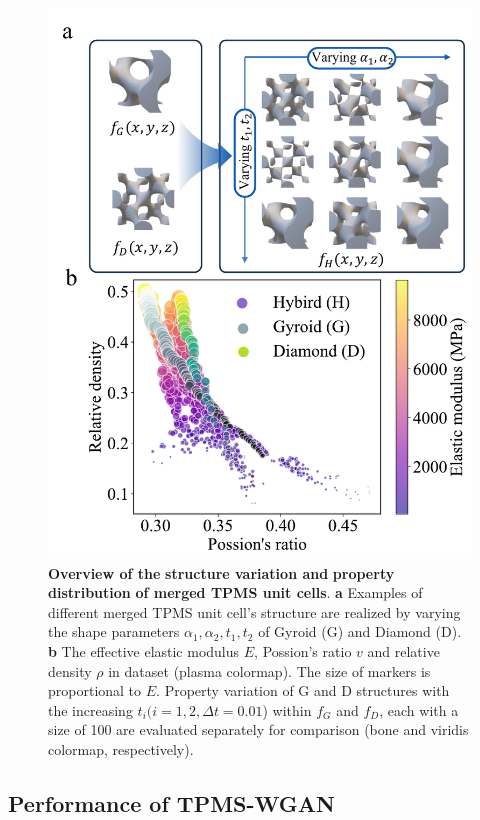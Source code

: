 \documentclass[preprint,review,12pt,authoryear]{elsarticle}
\begin{document}
\begin{figure}
    \centering
    \includegraphics[width=0.75\linewidth]{figures/2.pdf}
    \caption{\textbf{Overview of the} \textbf{structure variation and} \textbf{property} \textbf{distribution} \textbf{of merged TPMS unit cells}. \textbf{a} Examples of different merged TPMS unit cell’s structure are realized by varying the shape parameters $\alpha_1, \alpha_2,t_1,t_2$ of Gyroid (G) and Diamond (D).\textbf{ b }The effective elastic modulus $E$, Possion’s ratio $v$ and relative density $\rho$ in dataset (plasma colormap). The size of markers is proportional to $E$. Property variation of G and D structures with the increasing $t_i( i=1,2,\Delta t = 0.01$) within $f_G$ and $f_D$, each with a size of 100 are evaluated separately for comparison (bone and viridis colormap, respectively).}
    \label{fig:3}
\end{figure}  

\subsection{Performance of TPMS-WGAN}
\end{document}
